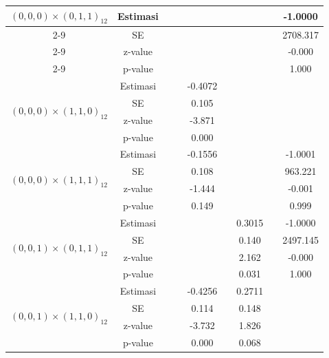 \begin{enumerate}[label=\alph*.]
\begin{longtable}{|c|c|c|c|c|c|c|c|c|}
            \multirow{4}{*}{$(0,0,0)\times(0,1,1)_{12}$}
            & Estimasi & {} & {} & {} & {} & {} & {} & -1.0000 \\ \cline{2-9}
            & SE       & {} & {} & {} & {} & {} & {} & 2708.317\\ \cline{2-9}
            & z-value  &  {}   & {} & {} & {} & {} & {} & -0.000 \\ \cline{2-9}
            & p-value  & {} & {} & {} & {} & {} & {} & 1.000 \\ \hline

            \multirow{4}{*}{$(0,0,0)\times(1,1,0)_{12}$}
            & Estimasi & {} & {} & -0.4072 & {} & {} & {} & {} \\ \cline{2-9}
            & SE       & {} & {} & 0.105 & {} & {} & {} & {}\\ \cline{2-9}
            & z-value  & {} & {} & -3.871 & {} & {} & {} & {}\\ \cline{2-9}
            & p-value  & {} & {} & 0.000 & {} & {} & {} & {}\\ \hline

            \multirow{4}{*}{$(0,0,0)\times(1,1,1)_{12}$}
            & Estimasi & {} & {} & -0.1556 & {} & {} & {} & -1.0001\\ \cline{2-9}
            & SE       & {} & {} & 0.108 & {} & {} & {} & 963.221\\ \cline{2-9}
            & z-value  & {} & {} & -1.444 & {}   & {}   & {} & -0.001\\ \cline{2-9}
            & p-value  & {} & {} & 0.149 & {} & {} & {} & 0.999\\ \hline

            \multirow{4}{*}{$(0,0,1)\times(0,1,1)_{12}$}
            & Estimasi & {} & {} & {} & {} & 0.3015 & {} & -1.0000 \\ \cline{2-9}
            & SE       & {} & {} & {} & {} & 0.140 & {} & 2497.145\\ \cline{2-9}
            & z-value  & {} & {} & {} & {} & 2.162 & {} & -0.000\\ \cline{2-9}
            & p-value  & {} & {} & {} & {} & 0.031 & {} & 1.000\\ \hline

            \multirow{4}{*}{$(0,0,1)\times(1,1,0)_{12}$}
            & Estimasi & {} & {} & -0.4256 & {}  & 0.2711 & {} & {}\\ \cline{2-9}
            & SE       & {} & {} & 0.114 & {} & 0.148 & {} & {}\\ \cline{2-9}
            & z-value  & {} & {} & -3.732 & {} & 1.826 & {} & {}\\ \cline{2-9}
            & p-value  & {} & {} & 0.000 & {} & 0.068 & {} & {} \\ \hline


\end{longtable}
\end{enumerate}
